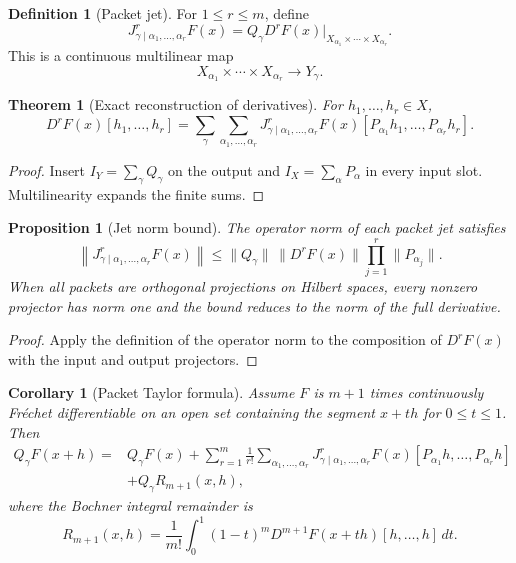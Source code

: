 \documentclass[11pt,a4paper]{article}
\newtheorem{theorem}{Theorem}[section]
\theoremstyle{plain}
\newtheorem{proposition}[proposition]{Proposition}
\newtheorem{corollary}[corollary]{Corollary}
\theoremstyle{definition}
\newtheorem{definition}[definition]{Definition}
\theoremstyle{remark}
\begin{document}
\begin{definition}[Packet jet]\label{def:packet_jet}
For $1\le r\le m$, define
\[
J^{r}_{\gamma\mid\alpha_1,\ldots,\alpha_r}F(x)
=
Q_\gamma D^rF(x)
\big|_{X_{\alpha_1}\times\cdots\times X_{\alpha_r}}.
\]
This is a continuous multilinear map
\[
X_{\alpha_1}\times\cdots\times X_{\alpha_r}
\longrightarrow
Y_\gamma.
\]
\end{definition}

\begin{theorem}[Exact reconstruction of derivatives]\label{thm:jet_reconstruction}
For $h_1,\ldots,h_r\in X$,
\[
D^rF(x)[h_1,\ldots,h_r]
=
\sum_{\gamma}
\sum_{\alpha_1,\ldots,\alpha_r}
J^{r}_{\gamma\mid\alpha_1,\ldots,\alpha_r}F(x)
[P_{\alpha_1}h_1,\ldots,P_{\alpha_r}h_r].
\]
\end{theorem}

\begin{proof}
Insert $I_Y=\sum_\gamma Q_\gamma$ on the output and $I_X=\sum_\alpha P_\alpha$ in every input slot.  Multilinearity expands the finite sums.
\end{proof}

\begin{proposition}[Jet norm bound]\label{prop:jet_norm_bound}
The operator norm of each packet jet satisfies
\[
\left\|J^{r}_{\gamma\mid\alpha_1,\ldots,\alpha_r}F(x)\right\|
\le
\|Q_\gamma\|\,\|D^rF(x)\|
\prod_{j=1}^r\|P_{\alpha_j}\|.
\]
When all packets are orthogonal projections on Hilbert spaces, every nonzero projector has norm one and the bound reduces to the norm of the full derivative.
\end{proposition}

\begin{proof}
Apply the definition of the operator norm to the composition of $D^rF(x)$ with the input and output projectors.
\end{proof}

\begin{corollary}[Packet Taylor formula]\label{cor:packet_taylor}
Assume $F$ is $m+1$ times continuously Fr\'echet differentiable on an open set containing the segment $x+th$ for $0\le t\le1$.  Then
\[
\begin{aligned}
Q_\gamma F(x+h)
={}&Q_\gamma F(x)
+
\sum_{r=1}^{m}\frac1{r!}
\sum_{\alpha_1,\ldots,\alpha_r}
J^{r}_{\gamma\mid\alpha_1,\ldots,\alpha_r}F(x)
[P_{\alpha_1}h,\ldots,P_{\alpha_r}h]\\
&+Q_\gamma R_{m+1}(x,h),
\end{aligned}
\]
where the Bochner integral remainder is
\[
R_{m+1}(x,h)
=
\frac1{m!}
\int_0^1(1-t)^m
D^{m+1}F(x+th)[h,\ldots,h]\,dt.
\]
\end{corollary}
\end{document}
